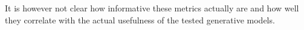 It is however not clear how informative these metrics actually are and how well
they correlate with the actual usefulness of the tested generative models.









